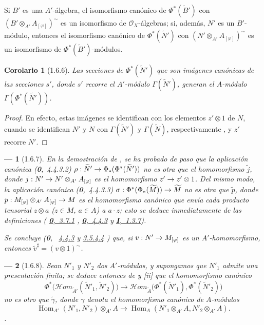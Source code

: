 \documentclass[oneside]{amsart}
\makeatletter
\theoremstyle{ega-env-style}
\newtheorem*{env}{---}
\theoremstyle{ega-thm-env-style}
\newtheorem*{corollary}{Corolario}
\theoremstyle{ega-defn-env-style}
\renewcommand{\to}{\mathchoice{\longrightarrow}{\rightarrow}{\rightarrow}{\rightarrow}}
\newcommand{\oldpage}[2][]{{\marginnote{\normalfont{\textbf{#1}~|~#2}}}\ignorespaces}
\let\EGAOriginalLabel\label
\renewcommand{\label}[1]{\phantomsection\EGAOriginalLabel{#1}}
\newcommand{\EGAUnavailableHyperref}[2]{%
  \begingroup
  \let\@latex@warning\@gobble
  \let\@latex@warning@no@line\@gobble
  \let\G@refundefinedtrue\relax
  \hyperref[#1]{#2}%
  \endgroup
}
\makeatother
\begin{document}
Si $B'$ es una $A'$-álgebra, el isomorfismo canónico de $\Phi^*(\widetilde{B}')$ con $(B'\otimes_{A'}A_{[\varphi]})^{\sim}$ es un isomorfismo de $\mathscr{O}_X$-álgebras;
si, además, $N'$ es un $B'$-módulo, entonces el isomorfismo canónico de $\Phi^*(\widetilde{N}')$ con $(N'\otimes_{A'}A_{[\varphi]})^{\sim}$ es un isomorfismo de $\Phi^*(\widetilde{B}')$-módulos.

\begin{corollary}[1.6.6]
\label{I.1.6.6}
Las secciones de $\Phi^*(\widetilde{N}')$ que son imágenes canónicas de las secciones $s'$, donde $s'$ recorre el $A'$-módulo $\Gamma(\widetilde{N}')$, generan el $A$-módulo $\Gamma(\Phi^*(\widetilde{N'}))$.
\end{corollary}

\begin{proof}
En efecto, estas imágenes se identifican con los elementos $z'\otimes 1$ de $N$, cuando se identifican $N'$ y $N$ con $\Gamma(\widetilde{N}')$ y $\Gamma(\widetilde{N})$, respectivamente , y $z'$ recorre $N'$.
\end{proof}

\begin{env}[1.6.7]
\label{I.1.6.7}
En la demostración de , se ha probado de paso que la aplicación canónica (\textbf{0},~4.4.3.2) $\rho:\widetilde{N}'\to\Phi_*(\Phi^*(\widetilde{N}'))$ no es otra que el homomorfismo $\widetilde{j}$,
\oldpage[I]{96}
donde $j:N'\to N'\otimes_{A'}A_{[\varphi]}$ es el homomorfismo $z'\to z'\otimes 1$.
Del mismo modo, la aplicación canónica (\textbf{0},~4.4.3.3) $\sigma:\Phi^*(\Phi_*(\widetilde{M}))\to\widetilde{M}$ no es otra que $\widetilde{p}$, donde $p:M_{[\varphi]}\otimes_{A'}A_{[\varphi]}\to M$ es el homomorfismo canónico que envía cada producto tensorial $z\otimes a$ ($z\in M$, $a\in A$) a $a\cdot z$;
esto se deduce inmediatamente de las definiciones (\EGAUnavailableHyperref{0.3.7.1}{\textbf{0},~3.7.1}, \EGAUnavailableHyperref{0.4.4.3}{\textbf{0},~4.4.3} y \hyperref[I.1.3.7]{\textbf{I},~1.3.7}).

Se concluye (\textbf{0},~\EGAUnavailableHyperref{0.4.4.3}{4.4.3} y \EGAUnavailableHyperref{0.3.5.4.4}{3.5.4.4}) que, si $v:N'\to M_{[\varphi]}$ es un $A'$-homomorfismo, entonces $\widetilde{v}^{\sharp}=(v\otimes 1)^{\sim}$.
\end{env}

\begin{env}[1.6.8]
\label{I.1.6.8}
Sean $N'_1$ y $N'_2$ dos $A'$-módulos, y supongamos que $N'_1$ admite una \emph{presentación finita};
se deduce entonces de  y [ii] que el
homomorfismo canónico 
\[
  \Phi^*\bigl(\mathscr{H}\!om_{\widetilde{A}'}
    (\widetilde{N}'_1,\widetilde{N}'_2)\bigr)
  \longrightarrow
  \mathscr{H}\!om_{\widetilde A}
    \bigl(\Phi^*(\widetilde{N}'_1),\Phi^*(\widetilde{N}'_2)\bigr)
\]
no es otro que $\widetilde{\gamma}$, donde $\gamma$ denota el homomorfismo canónico de $A$-módulos \[
  \operatorname{Hom}_{A'}(N'_1,N'_2)\otimes_{A'}A
  \longrightarrow
  \operatorname{Hom}_A(N'_1\otimes_{A'}A,N'_2\otimes_{A'}A).
\].
\end{env}
\end{document}

